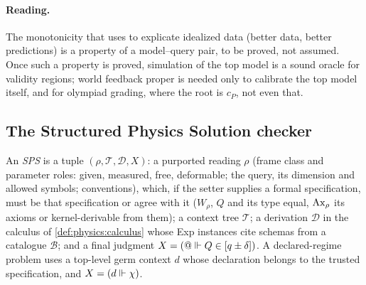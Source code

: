 \paragraph{Reading.} The monotonicity that \citet{laymon1987scott} uses to explicate
idealized data (better data, better predictions) is a property of a model--query pair, to
be proved, not assumed. Once such a property is proved, simulation of the top model is a
sound oracle for validity regions; world feedback proper is needed only to calibrate the
top model itself, and for olympiad grading, where the root is $c_P$, not even that.

\subsection{The Structured Physics Solution checker}\label{sec:physics:checker}

\begin{definition}\label{def:physics:sps}
An \emph{SPS} is a tuple $(\rho,\mathcal T,\mathcal D,X)$: a purported reading $\rho$ (frame
class and parameter roles: given, measured, free, deformable; the query, its dimension and
allowed symbols; conventions), which, if the setter supplies a formal specification, must
be that specification or agree with it ($W_\rho$, $Q$ and its type equal, $\mathrm{Ax}_\rho$ its
axioms or kernel-derivable from them); a context tree $\mathcal T$; a derivation $\mathcal D$ in the
calculus of \cref{def:physics:calculus} whose Exp instances cite schemas from a catalogue
$\mathcal B$; and a final judgment $X=(@\Vdash Q\in[q\pm\delta])$. A declared-regime problem
uses a top-level germ context $d$ whose declaration belongs to the trusted specification,
and $X=(d\Vdash\chi)$.
\end{definition}

